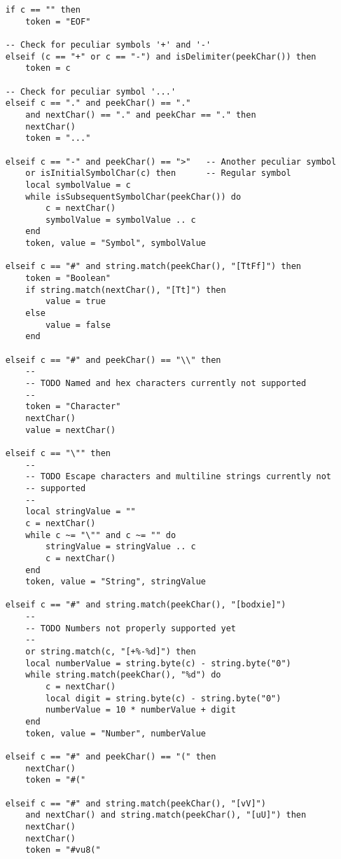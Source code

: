 \begin{verbatim}
    if c == "" then
        token = "EOF"

    -- Check for peculiar symbols '+' and '-'
    elseif (c == "+" or c == "-") and isDelimiter(peekChar()) then
        token = c

    -- Check for peculiar symbol '...'
    elseif c == "." and peekChar() == "."
        and nextChar() == "." and peekChar == "." then
        nextChar()
        token = "..."

    elseif c == "-" and peekChar() == ">"   -- Another peculiar symbol
        or isInitialSymbolChar(c) then      -- Regular symbol
        local symbolValue = c
        while isSubsequentSymbolChar(peekChar()) do
            c = nextChar()
            symbolValue = symbolValue .. c
        end
        token, value = "Symbol", symbolValue

    elseif c == "#" and string.match(peekChar(), "[TtFf]") then
        token = "Boolean"
        if string.match(nextChar(), "[Tt]") then
            value = true
        else
            value = false
        end

    elseif c == "#" and peekChar() == "\\" then
        --
        -- TODO Named and hex characters currently not supported
        --
        token = "Character"
        nextChar()
        value = nextChar()
        
    elseif c == "\"" then
        --
        -- TODO Escape characters and multiline strings currently not
        -- supported
        --
        local stringValue = ""
        c = nextChar()
        while c ~= "\"" and c ~= "" do
            stringValue = stringValue .. c
            c = nextChar()
        end
        token, value = "String", stringValue

    elseif c == "#" and string.match(peekChar(), "[bodxie]")
        --
        -- TODO Numbers not properly supported yet
        --
        or string.match(c, "[+%-%d]") then
        local numberValue = string.byte(c) - string.byte("0")
        while string.match(peekChar(), "%d") do
            c = nextChar()
            local digit = string.byte(c) - string.byte("0")
            numberValue = 10 * numberValue + digit
        end
        token, value = "Number", numberValue
        
    elseif c == "#" and peekChar() == "(" then
        nextChar()
        token = "#("

    elseif c == "#" and string.match(peekChar(), "[vV]")
        and nextChar() and string.match(peekChar(), "[uU]") then
        nextChar()
        nextChar()
        token = "#vu8("


\end{verbatim}
